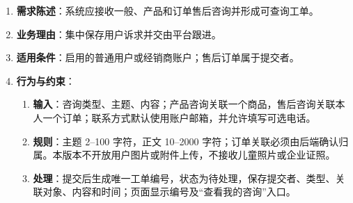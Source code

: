 \begin{enumerate}
\item {\bfseries 需求陈述}：系统应接收一般、产品和订单售后咨询并形成可查询工单。
\item {\bfseries 业务理由}：集中保存用户诉求并交由平台跟进。
\item {\bfseries 适用条件}：启用的普通用户或经销商账户；售后订单属于提交者。
\item {\bfseries 行为与约束}：
\begin{enumerate}
\item {\bfseries 输入}：咨询类型、主题、内容；产品咨询关联一个商品，售后咨询关联本人一个订单；联系方式默认使用账户邮箱，并允许填写可选电话。
\item {\bfseries 规则}：主题 2--100 字符，正文 10--2000 字符；订单关联必须由后端确认归属。本版本不开放用户图片或附件上传，不接收儿童照片或企业证照。
\item {\bfseries 处理}：提交后生成唯一工单编号，状态为待处理，保存提交者、类型、关联对象、内容和时间；页面显示编号及“查看我的咨询”入口。
\end{enumerate}

\end{enumerate}


